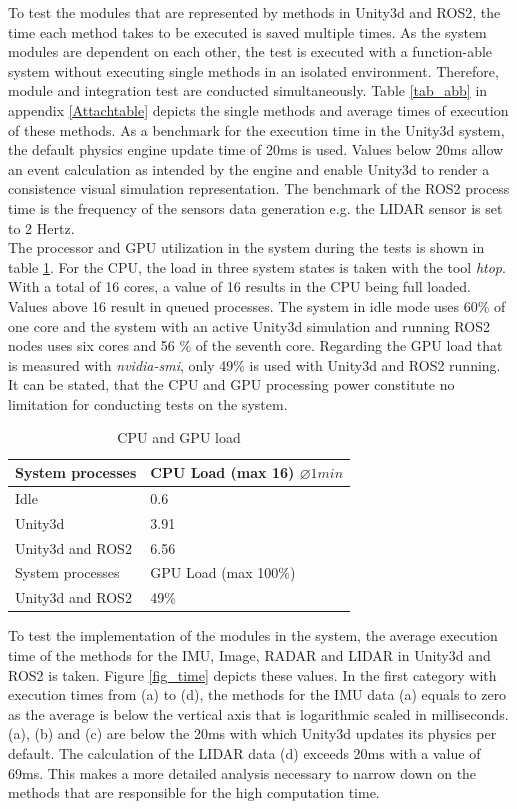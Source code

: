 	To test the modules that are represented by methods in Unity3d and ROS2, the time each method takes to be executed is saved multiple times. As the system modules are dependent on each other, the test is executed with a function-able system without executing single methods in an isolated environment. Therefore, module and integration test are conducted simultaneously. Table \ref{tab_abb} in appendix \ref{Attachtable} depicts the single methods and average times of execution of these methods. As a benchmark for the execution time in the Unity3d system, the default physics engine update time of 20ms is used. Values below 20ms allow an event calculation as intended by the engine and enable Unity3d to render a consistence visual simulation representation. The benchmark of the \ac{ROS2} process time is the frequency of the sensors data generation e.g. the \ac{LIDAR} sensor is set to 2 Hertz.\\
	
    The processor and \ac{GPU} utilization in the system during the tests is shown in table \ref{tab_cpuload}. For the CPU, the load in three system states is taken with the tool \textit{htop}. With a total of 16 cores, a value of 16 results in the CPU being full loaded. Values above 16 result in queued processes. The system in idle mode uses 60\% of one core and the system with an active Unity3d simulation and running ROS2 nodes uses six cores and 56 \% of the seventh core. Regarding the GPU load that is measured with \textit{nvidia-smi}, only 49\% is used with Unity3d and ROS2 running. It can be stated, that the CPU and GPU processing power constitute no limitation for conducting tests on the system.
		
		\begin{table}[H]
		\centering	
		\caption{CPU and GPU load}
		\begin{tabular}{l l } 
		\midrule\midrule 
		System processes & CPU Load (max 16) $\varnothing1min$\\ 
		\midrule
		Idle			 & 0.6 \\	
		Unity3d 		 & 3.91 \\
		Unity3d and ROS2 & 6.56 \\
		\midrule\midrule
		System processes & GPU Load (max 100\%)\\
		\midrule
		Unity3d and ROS2 & 49\% \\
	\end{tabular}
		\label{tab_cpuload}
	\end{table}

	To test the implementation of the modules in the system, the average execution time of the methods for the \ac{IMU}, Image, \ac{RADAR} and \ac{LIDAR} in Unity3d and \ac{ROS2} is taken. Figure \ref{fig_time} depicts these values. In the first category with execution times from (a) to (d), the methods for the \ac{IMU} data (a) equals to zero as the average is below the vertical axis that is logarithmic scaled in milliseconds. (a), (b) and (c) are below the 20ms with which Unity3d updates its physics per default. The calculation of the \ac{LIDAR} data (d) exceeds 20ms with a value of 69ms. This makes a more detailed analysis  necessary to narrow down on the methods that are responsible for the high computation time.\\
	
